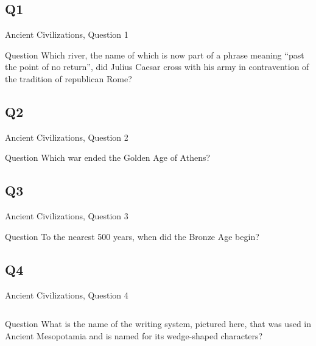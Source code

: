 \documentclass[11pt]{beamer}
\begin{document}
\subsection*{Q1}
\begin{frame}[t]{Ancient Civilizations, Question 1}
\begin{block}{Question}
Which river, the name of which is now part of a phrase meaning ``past the point of no return'', did Julius Caesar cross with his army in contravention of the tradition of republican Rome?
\end{block}
\end{frame}
\subsection*{Q2}
\begin{frame}[t]{Ancient Civilizations, Question 2}
\begin{block}{Question}
Which war ended the Golden Age of Athens?
\end{block}
\end{frame}
\subsection*{Q3}
\begin{frame}[t]{Ancient Civilizations, Question 3}
\begin{block}{Question}
To the nearest 500 years, when did the Bronze Age begin?
\end{block}
\end{frame}
\subsection*{Q4}
\begin{frame}[t]{Ancient Civilizations, Question 4}
\begin{columns}[T,totalwidth=\linewidth]
\begin{column}{0.32\linewidth}
\begin{block}{Question}
What is the name of the writing system, pictured here, that was used in Ancient Mesopotamia and is named for its wedge-shaped characters?
\end{block}
\end{column}
\begin{column}{0.65\linewidth}
\begin{center}
\texttt{[image: \{Images/cuneiform]}.jpg}
\end{center}
\end{column}
\end{columns}
\end{frame}
\end{document}
